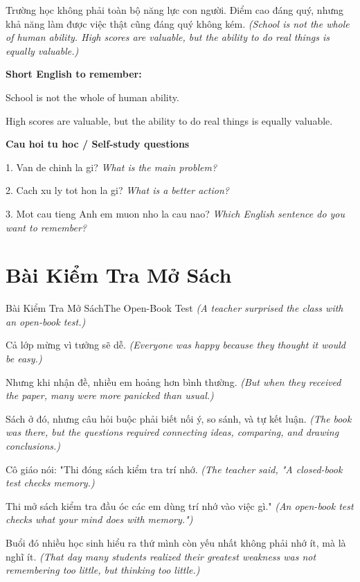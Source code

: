 \begin{baihoc}
Trường học không phải toàn bộ năng lực con người. Điểm cao đáng quý, nhưng khả năng làm được việc thật cũng đáng quý không kém.
\textit{(School is not the whole of human ability. High scores are valuable, but the ability to do real things is equally valuable.)}
\end{baihoc}

\begin{ghinhoanh}
\textbf{Short English to remember:}

School is not the whole of human ability.

High scores are valuable, but the ability to do real things is equally valuable.

\end{ghinhoanh}

\begin{tuhocnhanh}
\textbf{Cau hoi tu hoc / Self-study questions}

1. Van de chinh la gi? \textit{What is the main problem?}

2. Cach xu ly tot hon la gi? \textit{What is a better action?}

3. Mot cau tieng Anh em muon nho la cau nao? \textit{Which English sentence do you want to remember?}
\end{tuhocnhanh}
\ngancach

\section{Bài Kiểm Tra Mở Sách}
\begin{truyen}{Bài Kiểm Tra Mở Sách}{The Open-Book Test}
\textit{(A teacher surprised the class with an open-book test.)}

Cả lớp mừng vì tưởng sẽ dễ.
\textit{(Everyone was happy because they thought it would be easy.)}

Nhưng khi nhận đề, nhiều em hoảng hơn bình thường.
\textit{(But when they received the paper, many were more panicked than usual.)}

Sách ở đó, nhưng câu hỏi buộc phải biết nối ý, so sánh, và tự kết luận.
\textit{(The book was there, but the questions required connecting ideas, comparing, and drawing conclusions.)}

Cô giáo nói: "Thi đóng sách kiểm tra trí nhớ.
\textit{(The teacher said, "A closed-book test checks memory.)}

Thi mở sách kiểm tra đầu óc các em dùng trí nhớ vào việc gì."
\textit{(An open-book test checks what your mind does with memory.")}

Buổi đó nhiều học sinh hiểu ra thứ mình còn yếu nhất không phải nhớ ít, mà là nghĩ ít.
\textit{(That day many students realized their greatest weakness was not remembering too little, but thinking too little.)}

\end{truyen}

